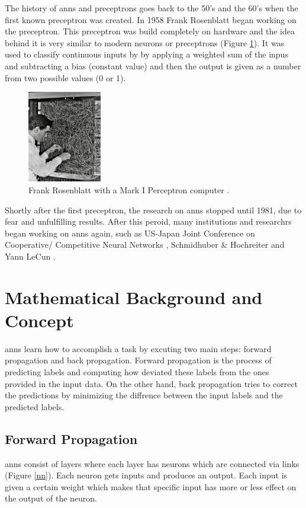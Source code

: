 \documentclass[runningheads]{llncs}
\begin{document}
The history of \gls{anns} and preceptrons goes back to the 50's and the 60's when 
the first known preceptron was created. In 1958 Frank Rosenblatt began working on the preceptron.  
This preceptron was build completely on hardware and the idea behind it is very similar 
to modern neurons or preceptrons (Figure \ref{fpp}). It was used to classify continuous inputs by 
by applying a weighted sum of the inpus and subtracting a bias (constant value) and 
then the output is given as a number from two possible values (0 or 1).
\begin{figure}[H]
    \label{fpp}
    \centering
    \includegraphics[height=4cm]{imge1}
    \caption{Frank Rosenblatt with a Mark I Perceptron computer \cite{frankpic}.}
\end{figure}
Shortly after the first preceptron, 
the research on \gls{anns} stopped until 1981, due to fear and unfulfilling results.
After this peroid, many institutions and researchrs began working on \gls{anns} again, such as 
US-Japan Joint Conference on Cooperative/ Competitive Neural Networks \cite{amari1982competition}, Schmidhuber \& Hochreiter \cite{hochreiter1997long} and Yann LeCun \cite{lecun1998gradient}. 



\section{Mathematical Background and Concept}
\gls{anns} learn how to accomplish a task by excuting two main steps:
forward propagation and back propagation. Forward propagation is the process of
predicting labels and computing how deviated these labels from the ones provided in the input data.
On the other hand, back propagation tries to correct the predictions by minimizing
the diffrence between the input labels and the predicted labels. 
\subsection{Forward Propagation}
\label{fb}
\gls{anns} consist of layers where each layer has neurons which are connected via links (Figure \ref{nn}). Each neuron gets inputs and produces an output. 
Each input is given a certain weight which makes that specific input has more or less effect on the output of the neuron.
\end{document}
